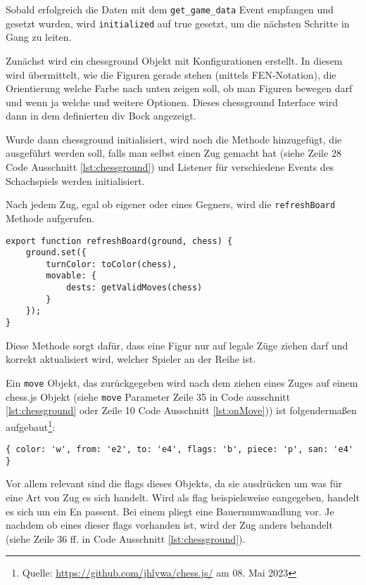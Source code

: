Sobald erfolgreich die Daten mit dem \verb|get_game_data| Event empfangen und gesetzt wurden, wird \verb|initialized| auf true gesetzt, um die nächsten Schritte in Gang zu leiten.

Zunächst wird ein chessground Objekt mit Konfigurationen erstellt. In diesem wird übermittelt, wie die Figuren gerade stehen (mittels FEN-Notation), die Orientierung welche Farbe nach unten zeigen soll, ob man Figuren bewegen darf und wenn ja welche und weitere Optionen. Dieses chessground Interface wird dann in dem definierten div Bock angezeigt.

Wurde dann chessground initialisiert, wird noch die Methode hinzugefügt, die ausgeführt werden soll, falls man selbst einen Zug gemacht hat (siehe Zeile 28 Code Ausschnitt \ref{lst:chessground}) und Listener für verschiedene Events des Schachspiels werden initialisiert.

Nach jedem Zug, egal ob eigener oder eines Gegners, wird die \verb|refreshBoard| Methode aufgerufen.

\begin{lstlisting}[style=codeStyle, caption={Die refreshBoard Methode}, label={lst:refreshBoard}]
export function refreshBoard(ground, chess) {
    ground.set({
        turnColor: toColor(chess),
        movable: {
            dests: getValidMoves(chess)
        }
    });
}
\end{lstlisting}

Diese Methode sorgt dafür, dass eine Figur nur auf legale Züge ziehen darf und korrekt aktualisiert wird, welcher Spieler an der Reihe ist.

Ein \verb|move| Objekt, das zurückgegeben wird nach dem ziehen eines Zuges auf einem chess.js Objekt (siehe \verb|move| Parameter Zeile 35 in Code ausschnitt \ref{lst:chessground} oder Zeile 10 Code Ausschnitt \ref{lst:onMove})) ist folgendermaßen aufgebaut\footnote{Quelle: \url{https://github.com/jhlywa/chess.js/} am 08. Mai 2023}:
\begin{verbatim}
{ color: 'w', from: 'e2', to: 'e4', flags: 'b', piece: 'p', san: 'e4' }
\end{verbatim}
Vor allem relevant sind die flags dieses Objekts, da sie ausdrücken um was für eine Art von Zug es sich handelt. Wird als flag beispielsweise \glqq e\grqq{ }angegeben, handelt es sich um ein En passent. Bei einem \glqq p\grqq{ }liegt eine Bauernumwandlung vor.
Je nachdem ob eines dieser flags vorhanden ist, wird der Zug anders behandelt (siehe Zeile 36 ff. in Code Ausschnitt \ref{lst:chessground}).


